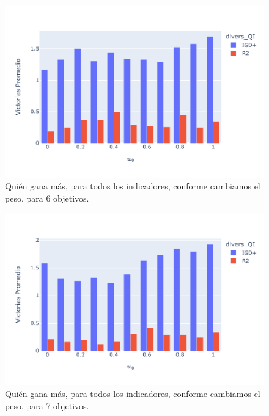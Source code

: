 \begin{figure} [H]
    \centering
    \includegraphics[width=\textwidth]{Figuras/borda_obj_6.pdf}
    \caption[Conteo de borda por número de objetivos]{Quién gana más, para todos los indicadores, conforme cambiamos el peso, para 6 objetivos.}
    \label{fig:borda_obj_6}
\end{figure}

\begin{figure} [H]
    \centering
    \includegraphics[width=\textwidth]{Figuras/borda_obj_7.pdf}
    \caption[Conteo de borda por número de objetivos]{Quién gana más, para todos los indicadores, conforme cambiamos el peso, para 7 objetivos.}
    \label{fig:borda_obj_7}
\end{figure}



